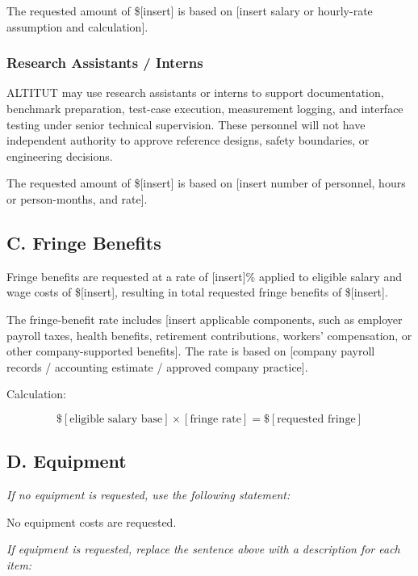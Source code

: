 \documentclass[11pt,letterpaper]{article}
\begin{document}
The requested amount of \$[insert] is based on [insert salary or hourly-rate
assumption and calculation].

\subsubsection*{Research Assistants / Interns}

ALTITUT may use research assistants or interns to support documentation,
benchmark preparation, test-case execution, measurement logging, and
interface testing under senior technical supervision. These personnel will
not have independent authority to approve reference designs, safety
boundaries, or engineering decisions.

The requested amount of \$[insert] is based on [insert number of personnel,
hours or person-months, and rate].

\subsection*{C. Fringe Benefits}

Fringe benefits are requested at a rate of [insert]\% applied to eligible
salary and wage costs of \$[insert], resulting in total requested fringe
benefits of \$[insert].

The fringe-benefit rate includes [insert applicable components, such as
employer payroll taxes, health benefits, retirement contributions, workers'
compensation, or other company-supported benefits]. The rate is based on
[company payroll records / accounting estimate / approved company practice].

Calculation:

\[
\$[\text{eligible salary base}]
\times
[\text{fringe rate}]
=
\$[\text{requested fringe}]
\]

\subsection*{D. Equipment}

\textit{If no equipment is requested, use the following statement:}

No equipment costs are requested.

\medskip

\textit{If equipment is requested, replace the sentence above with a
description for each item:}
\end{document}
